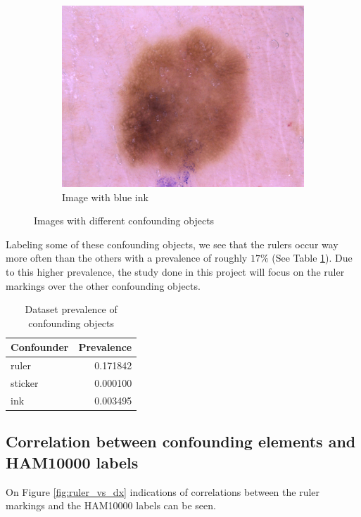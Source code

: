 \begin{figure}[ht]
\begin{center}
\begin{subfigure}[b]{0.3\textwidth}
            \includegraphics[width=\textwidth]{./images/ISIC_0027514.jpg}
            \caption{Image with blue ink}
        \end{subfigure}
    \end{center}
    \caption{Images with different confounding objects}
    \label{fig:confounding_objects}
\end{figure}

Labeling some of these confounding objects, we see that the rulers occur way more often than the others with a prevalence of roughly $17\%$ (See Table \ref{table:confounding_objects}).
Due to this higher prevalence, the study done in this project will focus on the ruler markings over the other confounding objects.

\begin{table}
    \centering
    \begin{tabular}{|l|r|}
        \hline 
        Confounder &  Prevalence \\ \hline
        ruler   &  0.171842 \\ \hline
        sticker &  0.000100 \\ \hline
        ink     &  0.003495 \\ \hline
    \end{tabular}
    \caption{Dataset prevalence of confounding objects}
    \label{table:confounding_objects}
\end{table}

\subsection{Correlation between confounding elements and HAM10000 labels}
On Figure \ref{fig:ruler_vs_dx} indications of correlations between the ruler markings and the HAM10000 labels can be seen.

